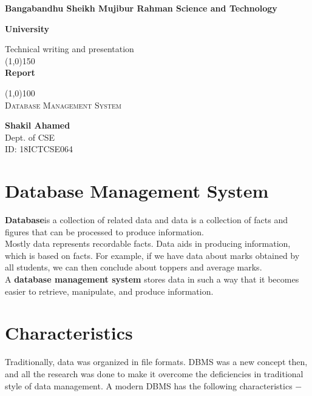 \documentclass[11pt]{article}
\begin{document}
\begin{titlepage}

\textbf{Bangabandhu Sheikh Mujibur Rahman Science and Technology}
\begin{center}
\textbf{University\\}

\bigskip
\bigskip
\bigskip
\medskip
\bigskip
\bigskip
\medskip

Technical writing and presentation\\
\line(1,0){150}\\
[5mm]
\huge {\bfseries Report\\}

\line(1,0){100}\\
[.5mm]
\textsc{\Large Database Management System}

\end{center} 
\vfill

\begin{flushright}

\textbf{\large Shakil Ahamed\\}
Dept. of CSE\\ 
ID: 18ICTCSE064\\

\end{flushright}
\end{titlepage}

\section*{Database Management System\\}
\textbf{Database}is a collection of related data and data is a collection of facts and figures that can be processed to produce information.\\
Mostly data represents recordable facts. Data aids in producing information, which is based on facts. For example, if we have data about marks obtained by all students, we can then conclude about toppers and average marks.\\
A \textbf{database management system} stores data in such a way that it becomes easier to retrieve, manipulate, and produce information.\\

\section*{Characteristics}

Traditionally, data was organized in file formats. DBMS was a new concept then, and all the research was done to make it overcome the deficiencies in traditional style of data management. A modern DBMS has the following characteristics −\\
\end{document}
